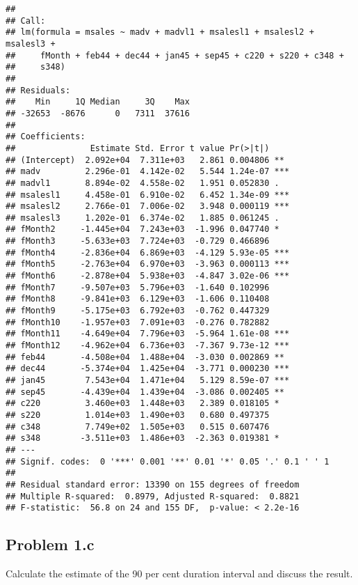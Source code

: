 \documentclass[
]{article}
\begin{document}
\begin{verbatim}
## 
## Call:
## lm(formula = msales ~ madv + madvl1 + msalesl1 + msalesl2 + msalesl3 + 
##     fMonth + feb44 + dec44 + jan45 + sep45 + c220 + s220 + c348 + 
##     s348)
## 
## Residuals:
##    Min     1Q Median     3Q    Max 
## -32653  -8676      0   7311  37616 
## 
## Coefficients:
##               Estimate Std. Error t value Pr(>|t|)    
## (Intercept)  2.092e+04  7.311e+03   2.861 0.004806 ** 
## madv         2.296e-01  4.142e-02   5.544 1.24e-07 ***
## madvl1       8.894e-02  4.558e-02   1.951 0.052830 .  
## msalesl1     4.458e-01  6.910e-02   6.452 1.34e-09 ***
## msalesl2     2.766e-01  7.006e-02   3.948 0.000119 ***
## msalesl3     1.202e-01  6.374e-02   1.885 0.061245 .  
## fMonth2     -1.445e+04  7.243e+03  -1.996 0.047740 *  
## fMonth3     -5.633e+03  7.724e+03  -0.729 0.466896    
## fMonth4     -2.836e+04  6.869e+03  -4.129 5.93e-05 ***
## fMonth5     -2.763e+04  6.970e+03  -3.963 0.000113 ***
## fMonth6     -2.878e+04  5.938e+03  -4.847 3.02e-06 ***
## fMonth7     -9.507e+03  5.796e+03  -1.640 0.102996    
## fMonth8     -9.841e+03  6.129e+03  -1.606 0.110408    
## fMonth9     -5.175e+03  6.792e+03  -0.762 0.447329    
## fMonth10    -1.957e+03  7.091e+03  -0.276 0.782882    
## fMonth11    -4.649e+04  7.796e+03  -5.964 1.61e-08 ***
## fMonth12    -4.962e+04  6.736e+03  -7.367 9.73e-12 ***
## feb44       -4.508e+04  1.488e+04  -3.030 0.002869 ** 
## dec44       -5.374e+04  1.425e+04  -3.771 0.000230 ***
## jan45        7.543e+04  1.471e+04   5.129 8.59e-07 ***
## sep45       -4.439e+04  1.439e+04  -3.086 0.002405 ** 
## c220         3.460e+03  1.448e+03   2.389 0.018105 *  
## s220         1.014e+03  1.490e+03   0.680 0.497375    
## c348         7.749e+02  1.505e+03   0.515 0.607476    
## s348        -3.511e+03  1.486e+03  -2.363 0.019381 *  
## ---
## Signif. codes:  0 '***' 0.001 '**' 0.01 '*' 0.05 '.' 0.1 ' ' 1
## 
## Residual standard error: 13390 on 155 degrees of freedom
## Multiple R-squared:  0.8979, Adjusted R-squared:  0.8821 
## F-statistic:  56.8 on 24 and 155 DF,  p-value: < 2.2e-16
\end{verbatim}

\hypertarget{problem-1.c}{%
\subsection{Problem 1.c}\label{problem-1.c}}

Calculate the estimate of the 90 per cent duration interval and discuss
the result.
\end{document}
